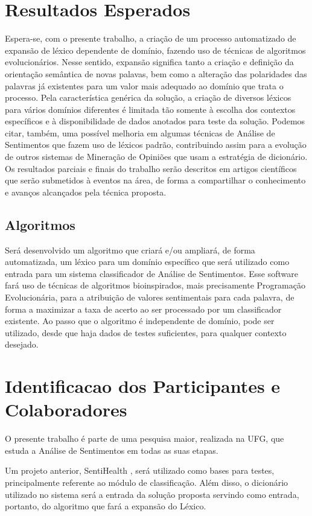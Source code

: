 \documentclass[a4paper,11pt]{article}
\begin{document}
\section{Resultados Esperados}
\label{sec:result}
Espera-se, com o presente trabalho, a criação de um processo automatizado de expansão de léxico dependente de domínio, fazendo uso de técnicas de algoritmos evolucionários. Nesse sentido, expansão significa tanto a criação e definição da orientação semântica de novas palavas, bem como a alteração das polaridades das palavras já existentes para um valor mais adequado ao domínio que trata o processo.
Pela característica genérica da solução, a criação de diversos léxicos para vários domínios diferentes é limitada tão somente à escolha dos contextos específicos e à disponibilidade de dados anotados para teste da solução.
Podemos citar, também, uma possível melhoria em algumas técnicas de Análise de Sentimentos que fazem uso de léxicos padrão, contribuindo assim para a evolução de outros sistemas de Mineração de Opiniões que usam a estratégia de dicionário.
Os resultados parciais e finais do trabalho serão descritos em artigos científicos que serão submetidos à eventos na área, de forma a compartilhar o conhecimento e avanços alcançados pela técnica proposta.

\subsection{Algoritmos} %
Será desenvolvido um algoritmo que criará e/ou ampliará, de forma automatizada, um léxico para um domínio específico que será utilizado como entrada para um sistema classificador de Análise de Sentimentos.
Esse software fará uso de técnicas de algoritmos bioinspirados, mais precisamente Programação Evolucionária, para a atribuição de valores sentimentais para cada palavra, de forma a maximizar a taxa de acerto ao ser processado por um classificador existente.
Ao passo que o algoritmo é independente de domínio, pode ser utilizado, desde que haja dados de testes suficientes, para qualquer contexto desejado.

\section{Identificacao dos Participantes e Colaboradores}
O presente trabalho é parte de uma pesquisa maior, realizada na UFG, que estuda a Análise de Sentimentos em todas as suas etapas.

Um projeto anterior, SentiHealth \cite{Rodrigues2016}, será utilizado como bases para testes, principalmente referente ao módulo de classificação. Além disso, o dicionário utilizado no sistema será a entrada da solução proposta servindo como entrada, portanto, do algoritmo que fará a expansão do Léxico.
\end{document}
